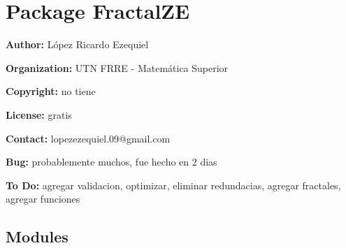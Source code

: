 %
%
%


\section{Package FractalZE}

    \label{FractalZE}
\textbf{Author:} López Ricardo Ezequiel



\textbf{Organization:} UTN FRRE - Matemática Superior



\textbf{Copyright:} no tiene



\textbf{License:} gratis



\textbf{Contact:} lopezezequiel.09@gmail.com



\textbf{Bug:} probablemente muchos, fue hecho en 2 dias



\textbf{To Do:} agregar validacion, optimizar, eliminar redundacias, agregar fractales, 
agregar funciones





\subsection{Modules}

